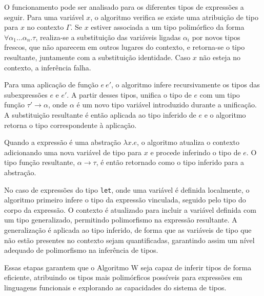 O funcionamento pode ser analisado para os diferentes tipos de expressões a seguir.
Para uma variável $x$, o algoritmo verifica se existe uma atribuição de tipo para $x$ no contexto $\Gamma$.
Se $x$ estiver associada a um tipo polimórfico da forma $\forall \alpha_1 \ldots \alpha_n . \tau$, realiza-se a substituição das variáveis ligadas $\alpha_i$ por novos tipos frescos, que não aparecem em outros lugares do contexto, e retorna-se o tipo resultante, juntamente com a substituição identidade.
Caso $x$ não esteja no contexto, a inferência falha.

Para uma aplicação de função $e\ e'$, o algoritmo infere recursivamente os tipos das subexpressões $e$ e $e'$.
A partir desses tipos, unifica o tipo de $e$ com um tipo função $\tau' \to \alpha$, onde $\alpha$ é um novo tipo variável introduzido durante a unificação.
A substituição resultante é então aplicada ao tipo inferido de $e$ e o algoritmo retorna o tipo correspondente à aplicação.

Quando a expressão é uma abstração $\lambda x . e$, o algoritmo atualiza o contexto adicionando uma nova variável de tipo para $x$ e procede inferindo o tipo de $e$.
O tipo função resultante, $\alpha \to \tau$, é então retornado como o tipo inferido para a abstração.

No caso de expressões do tipo \texttt{let}, onde uma variável é definida localmente, o algoritmo primeiro infere o tipo da expressão vinculada, seguido pelo tipo do corpo da expressão.
O contexto é atualizado para incluir a variável definida com um tipo generalizado, permitindo polimorfismo na expressão resultante.
A generalização é aplicada ao tipo inferido, de forma que as variáveis de tipo que não estão presentes no contexto sejam quantificadas, garantindo assim um nível adequado de polimorfismo na inferência de tipos.

Essas etapas garantem que o Algoritmo W seja capaz de inferir tipos de forma eficiente, atribuindo os tipos mais polimórficos possíveis para expressões em linguagens funcionais e explorando as capacidades do sistema de tipos.
